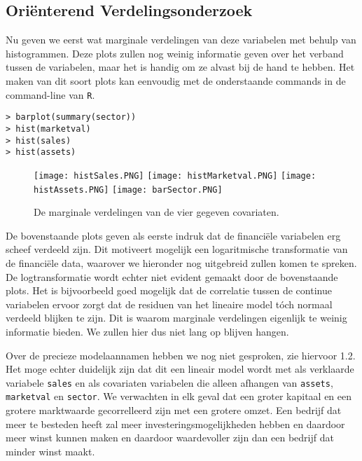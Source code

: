 \documentclass[a4paper]{report}
\begin{document}
\subsection{Ori\"enterend Verdelingsonderzoek}
\label{Verdelingsonderzoek}
  Nu geven we eerst wat marginale verdelingen van deze variabelen met behulp van histogrammen. Deze plots zullen nog weinig informatie geven over het verband tussen de variabelen, maar het is handig om ze alvast bij de hand te hebben. Het maken van dit soort plots kan eenvoudig met de onderstaande commands in de command-line van \verb!R!.
  
  \begin{verbatim}
> barplot(summary(sector))
> hist(marketval)
> hist(sales)
> hist(assets)
  \end{verbatim}


  \begin{figure}[H]
  \label{covariaten marginaal}
  \begin{center}
  \texttt{[image: histSales.PNG]}
  \texttt{[image: histMarketval.PNG]}
  \texttt{[image: histAssets.PNG]}
  \texttt{[image: barSector.PNG]}
  \end{center}
  \caption{De marginale verdelingen van de vier gegeven covariaten.}
  \end{figure}
  
  De bovenstaande plots geven als eerste indruk dat de financi\"ele variabelen erg scheef verdeeld zijn. Dit motiveert mogelijk een logaritmische transformatie van de financi\"ele data, waarover we hieronder nog uitgebreid zullen komen te spreken. De logtransformatie wordt echter niet evident gemaakt door de bovenstaande plots. Het is bijvoorbeeld goed mogelijk dat de correlatie tussen de continue variabelen ervoor zorgt dat de residuen van het lineaire model t\' och normaal verdeeld blijken te zijn. Dit is waarom marginale verdelingen eigenlijk te weinig informatie bieden. We zullen hier dus niet lang op blijven hangen.
  
  Over de precieze modelaannamen hebben we nog niet gesproken, zie hiervoor 1.2. Het moge echter duidelijk zijn dat dit een lineair model wordt met als verklaarde variabele \verb!sales! en als covariaten variabelen die alleen afhangen van \verb!assets!, \verb!marketval! en \verb!sector!. We verwachten in elk geval dat een groter kapitaal en een grotere marktwaarde gecorrelleerd zijn met een grotere omzet. Een bedrijf dat meer te besteden heeft zal meer investeringsmogelijkheden hebben en daardoor meer winst kunnen maken en daardoor waardevoller zijn dan een bedrijf dat minder winst maakt. 
  
\end{document}
